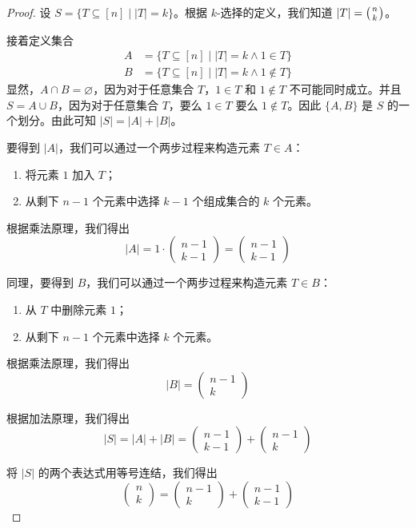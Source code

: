 \begin{proof}
    设 $S = \{T \subseteq [n] \mid |T| = k\}$。根据 $k$-选择的定义，我们知道 $|T| = \big({n \atop k}\big)$。

    接着定义集合
    \begin{align*}
        A & = \{T \subseteq [n] \mid |T| = k ∧ 1 \in T\}    \\
        B & = \{T \subseteq [n] \mid |T| = k ∧ 1 \notin T\}
    \end{align*}
    显然，$A \cap B = \varnothing$，因为对于任意集合 $T$，$1 \in T$ 和 $1 \notin T$ 不可能同时成立。并且 $S = A \cup B$，因为对于任意集合 $T$，要么 $1 \in T$ 要么 $1 \notin T$。因此 $\{A,B\}$ 是 $S$ 的一个划分。由此可知 $|S| = |A| + |B|$。

    要得到 $|A|$，我们可以通过一个两步过程来构造元素 $T \in A$：
    \begin{enumerate}[label=(\arabic*)]
        \item 将元素 $1$ 加入 $T$；
        \item 从剩下 $n-1$ 个元素中选择 $k-1$ 个组成集合的 $k$ 个元素。
    \end{enumerate}
    根据乘法原理，我们得出
    \[|A| = 1 \cdot \begin{pmatrix}n-1\\k-1\end{pmatrix} = \begin{pmatrix}n-1\\k-1\end{pmatrix}\]

    同理，要得到 $B$，我们可以通过一个两步过程来构造元素 $T \in B$：
    \begin{enumerate}[label=(\arabic*)]
        \item 从 $T$ 中删除元素 $1$；
        \item 从剩下 $n-1$ 个元素中选择 $k$ 个元素。
    \end{enumerate}
    根据乘法原理，我们得出
    \[|B| = \begin{pmatrix}n-1\\k\end{pmatrix}\]

    根据加法原理，我们得出
    \[|S|=|A|+|B| = \begin{pmatrix}n-1\\k-1\end{pmatrix} + \begin{pmatrix}n-1\\k\end{pmatrix}\]

    将 $|S|$ 的两个表达式用等号连结，我们得出
    \[\begin{pmatrix}n\\k\end{pmatrix}=\begin{pmatrix}n-1\\k\end{pmatrix}+\begin{pmatrix}n-1\\k-1\end{pmatrix}\]
\end{proof}

